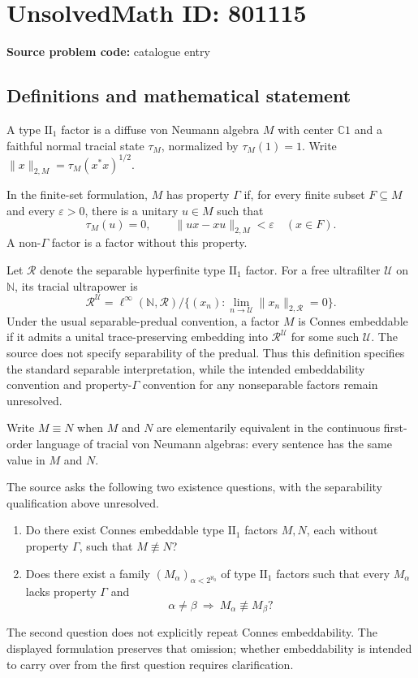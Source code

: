 \documentclass[11pt]{article}
\newcommand{\N}{\mathbb{N}}
\newcommand{\C}{\mathbb{C}}
\begin{document}
\section*{UnsolvedMath ID: 801115}
\textbf{Source problem code:} catalogue entry
\subsection{Definitions and mathematical statement}
A type \(\mathrm{II}_1\) factor is a diffuse von Neumann algebra \(M\) with center \(\C 1\) and a faithful normal tracial state \(\tau_M\), normalized by \(\tau_M(1)=1\). Write \(\|x\|_{2,M}=\tau_M(x^*x)^{1/2}\).

In the finite-set formulation, \(M\) has property \(\Gamma\) if, for every finite subset \(F\subseteq M\) and every \(\varepsilon>0\), there is a unitary \(u\in M\) such that
\[
\tau_M(u)=0,\qquad \|ux-xu\|_{2,M}<\varepsilon\quad(x\in F).
\]
A non-\(\Gamma\) factor is a factor without this property.

Let \(\mathcal R\) denote the separable hyperfinite type \(\mathrm{II}_1\) factor. For a free ultrafilter \(\mathcal U\) on \(\N\), its tracial ultrapower is
\[
\mathcal R^{\mathcal U}=\ell^\infty(\N,\mathcal R)\big/\{(x_n):\lim_{n\to\mathcal U}\|x_n\|_{2,\mathcal R}=0\}.
\]
Under the usual separable-predual convention, a factor \(M\) is Connes embeddable if it admits a unital trace-preserving embedding into \(\mathcal R^{\mathcal U}\) for some such \(\mathcal U\). The source does not specify separability of the predual. Thus this definition specifies the standard separable interpretation, while the intended embeddability convention and property-\(\Gamma\) convention for any nonseparable factors remain unresolved.

Write \(M\equiv N\) when \(M\) and \(N\) are elementarily equivalent in the continuous first-order language of tracial von Neumann algebras: every sentence has the same value in \(M\) and \(N\).

The source asks the following two existence questions, with the separability qualification above unresolved.
\begin{enumerate}
\item Do there exist Connes embeddable type \(\mathrm{II}_1\) factors \(M,N\), each without property \(\Gamma\), such that \(M\not\equiv N\)?
\item Does there exist a family \((M_\alpha)_{\alpha<2^{\aleph_0}}\) of type \(\mathrm{II}_1\) factors such that every \(M_\alpha\) lacks property \(\Gamma\) and
\[
\alpha\ne\beta\ \Longrightarrow\ M_\alpha\not\equiv M_\beta?
\]
\end{enumerate}
The second question does not explicitly repeat Connes embeddability. The displayed formulation preserves that omission; whether embeddability is intended to carry over from the first question requires clarification.
\end{document}
